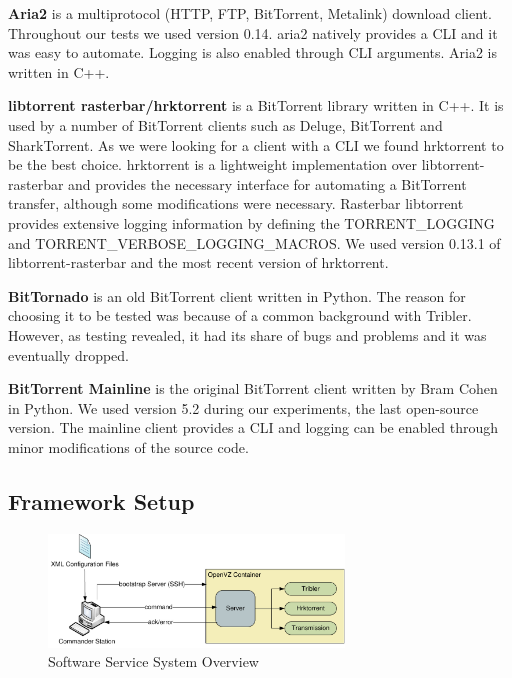 \textbf{Aria2} is a multiprotocol (HTTP, FTP, BitTorrent, Metalink) download
client. Throughout our tests we used version 0.14. aria2 natively provides a
CLI and it was easy to automate. Logging is also enabled through CLI
arguments. Aria2 is written in C++.

\textbf{libtorrent rasterbar/hrktorrent} is a BitTorrent library written in
C++. It is used by a number of BitTorrent clients such as Deluge, BitTorrent
and SharkTorrent. As we were looking for a client with a CLI we found
hrktorrent to be the best choice. hrktorrent is a lightweight implementation
over libtorrent-rasterbar and provides the necessary interface for automating
a BitTorrent transfer, although some modifications were necessary. Rasterbar
libtorrent provides extensive logging information by defining the
TORRENT\_LOGGING and TORRENT\_VERBOSE\_LOGGING\_MACROS. We used version 0.13.1
of libtorrent-rasterbar and the most recent version of hrktorrent.

\textbf{BitTornado} is an old BitTorrent client written in Python. The reason
for choosing it to be tested was because of a common background with Tribler.
However, as testing revealed, it had its share of bugs and problems and it was
eventually dropped.

\textbf{BitTorrent Mainline} is the original BitTorrent client written by Bram
Cohen in Python. We used version 5.2 during our experiments, the last
open-source version. The mainline client provides a CLI and logging can be
enabled through minor modifications of the source code.

\subsection{Framework Setup}
\label{sec:deploy-fwork}

\begin{figure}[h]
  \begin{center}
    \includegraphics[width=0.7\textwidth]{src/img/virt-infra/service-arch}
  \end{center}
  \caption{Software Service System Overview}
  \label{fig:virt-infra:service-arch}
\end{figure}

